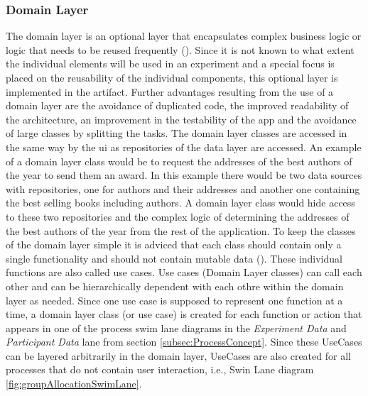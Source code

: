 
\subsubsection{Domain Layer}

The domain layer is an optional layer that encapsulates complex business logic or logic that needs to be reused frequently (\cite{Google.2023}). Since it is not known to what extent the individual elements will be used in an experiment and a special focus is placed on the reusability of the individual components, this optional layer is implemented in the artifact. Further advantages resulting from the use of a domain layer are the avoidance of duplicated code, the improved readability of the architecture, an improvement in the testability of the app and the avoidance of large classes by splitting the tasks. The domain layer classes are accessed in the same way by the \ac{ui} as repositories of the data layer are accessed. An example of a domain layer class would be to request the addresses of the best authors of the year to send them an award. In this example there would be two data sources with repositories, one for authors and their addresses and another one containing the best selling books including authors. A domain layer class would hide access to these two repositories and the complex logic of determining the addresses of the best authors of the year from the rest of the application. To keep the classes of the domain layer simple it is adviced that each class should contain only a single functionality and should not contain mutable data (\cite{Google.2023}). These individual functions are also called use cases. Use cases (Domain Layer classes) can call each other and can be hierarchically dependent with each othre within the domain layer as needed. Since one use case is supposed to represent one function at a time, a domain layer class (or use case) is created for each function or action  that appears in one of the process swim lane diagrams in the \textit{Experiment Data} and \textit{Participant Data} lane from section \ref{subsec:ProcessConcept}. Since these UseCases can be layered arbitrarily in the domain layer, UseCases are also created for all processes that do not contain user interaction, i.e., Swin Lane diagram \ref{fig:groupAllocationSwimLane}.



